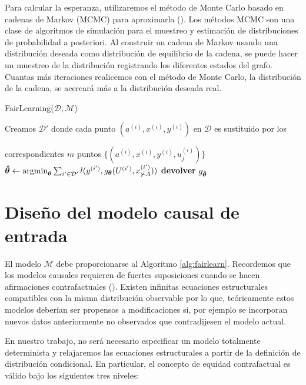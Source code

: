 \documentclass[oneside,openright,titlepage,numbers=noenddot,openany,headinclude,footinclude=true,
cleardoublepage=empty,abstractoff,BCOR=5mm,paper=a4,fontsize=12pt,main=spanish]{scrreprt}
\begin{document}
Para calcular la esperanza, utilizaremos el método de Monte Carlo basado en cadenas de Markov (MCMC) para aproximarla (\cite{mcmc2003}). Los métodos MCMC son una clase de algoritmos de simulación para el muestreo y estimación de distribuciones de probabilidad a posteriori. Al construir un cadena de Markov usando una distribución deseada como distribución de equilibrio de la cadena, se puede hacer un muestreo de la distribución registrando los diferentes estados del grafo. Cuantas más iteraciones realicemos con el método de Monte Carlo, la distribución de la cadena, se acercará más a la distribución deseada real.

\begin{algorithm}[h]
\caption{FairLearning($\mathcal{D},\mathcal{M}$)}
\label{alg:fairlearn}
    Creamos $\mathcal{D}'$ donde cada punto $(a^{(i)},x^{(i)},y^{(i)})$ en $\mathcal{D}$ es sustituido por los 
    
    correspondientes $m$ puntos $\{(a^{(i)},x^{(i)},y^{(i)},u_j^{(i)})\}$\;
    $\bm{\hat{\theta}} \leftarrow \text{argmin}_{\bm{\theta}} \sum_{i'\in \mathcal{D}'} l(y^{(i')},g_{\bm{\theta}}(U^{(i')},x_{\not \succ A}^{(i')}))$\;
   \textbf{devolver} $g_{\bm{\hat{\theta}}}$\;
\end{algorithm}

\section{Diseño del modelo causal de entrada}

\label{sec:modeloentrada}

El modelo $\mathcal{M}$ debe proporcionarse al Algoritmo \ref{alg:fairlearn}. Recordemos que los modelos causales requieren de fuertes suposiciones cuando se hacen afirmaciones contrafactuales (\cite{fairnesslearning2019}). Existen infinitas ecuaciones estructurales compatibles con la misma distribución observable por lo que, teóricamente estos modelos deberían ser propensos a modificaciones si, por ejemplo se incorporan nuevos datos anteriormente no observados que contradijesen el modelo actual.

En nuestro trabajo, no será necesario especificar un modelo totalmente determinista y relajaremos las ecuaciones estructurales a partir de la definición de distribución condicional. En particular, el concepto de equidad contrafactual es válido bajo los siguientes tres niveles:
\end{document}
